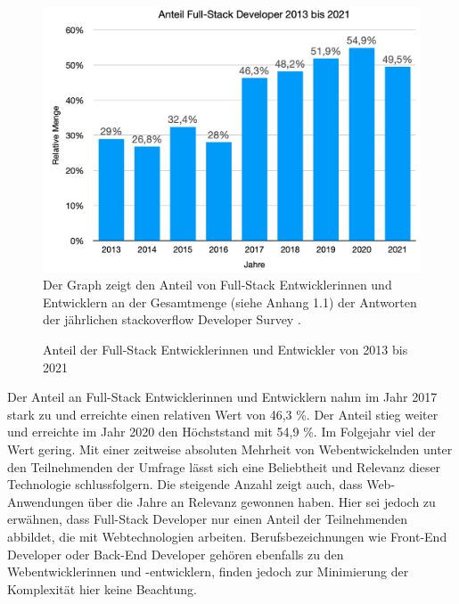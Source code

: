 \documentclass[a4paper]{scrartcl}
\begin{document}
\begin{figure}[H]
	\centering
		\caption{Anteil der Full-Stack Entwicklerinnen und Entwickler von 2013 bis 2021}
	\includegraphics[scale=0.28]{_assets/stackoverflow_fullstack_developers.png} \\
	Der Graph zeigt den Anteil von Full-Stack Entwicklerinnen und Entwicklern an der Gesamtmenge (siehe Anhang 1.1) der Antworten der jährlichen stackoverflow Developer Survey \autocite{stackoverflow_2015,stackoverflow_2016,stackoverflow_2017,stackoverflow_2018,stackoverflow_2019,stackoverflow_2020,stackoverflow_2021}.  
\end{figure}

Der Anteil an Full-Stack Entwicklerinnen und Entwicklern nahm im Jahr 2017 stark zu und erreichte einen relativen Wert von 46,3 \%. Der Anteil stieg weiter und erreichte im Jahr 2020 den Höchststand mit 54,9 \%. Im Folgejahr viel der Wert gering. Mit einer zeitweise absoluten Mehrheit von Webentwickelnden unter den Teilnehmenden der Umfrage lässt sich eine Beliebtheit und Relevanz dieser Technologie schlussfolgern. Die steigende Anzahl zeigt auch, dass Web-Anwendungen über die Jahre an Relevanz gewonnen haben. Hier sei jedoch zu erwähnen, dass Full-Stack Developer nur einen Anteil der Teilnehmenden abbildet, die mit Webtechnologien arbeiten. Berufsbezeichnungen wie Front-End Developer oder Back-End Developer gehören ebenfalls zu den Webentwicklerinnen und -entwicklern, finden jedoch zur Minimierung der Komplexität hier keine Beachtung. \\ 
\end{document}
